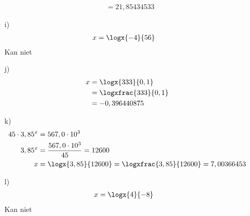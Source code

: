 \begin{antwoord}{16}
\begin{enumerate}
\begin{align*}
&= 21,85434533
\end{align*}
 \item[i)]
 \begin{align*}
x &= \logx{-4}{56}
\end{align*}
Kan niet
 \item[j)]
 \begin{align*}
x &= \logx{333}{0,1}\\
 &= \logxfrac{333}{0,1}\\
 &= -0,396440875
\end{align*}
 \item[k)]
 \begin{align*}
45 \cdot 3,85^x &= 567,0 \cdot 10^3 \\
3,85^x &= \frac{567,0 \cdot 10^3}{45} = 12600 \\
x &= \logx{3,85}{12600} = \logxfrac{3,85}{12600} = 7,00366453\\
\end{align*}
 \item[l)]
 \begin{align*}
x &= \logx{4}{-8}
\end{align*}
Kan niet
 \end{enumerate}
\end{antwoord}

